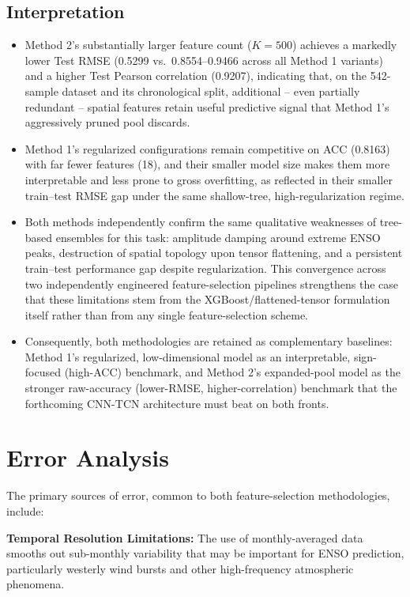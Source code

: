 \subsection{Interpretation}
\begin{itemize}
\item Method 2's substantially larger feature count ($K=500$) achieves a markedly lower Test RMSE (0.5299 vs.\ 0.8554--0.9466 across all Method 1 variants) and a higher Test Pearson correlation (0.9207), indicating that, on the 542-sample dataset and its chronological split, additional -- even partially redundant -- spatial features retain useful predictive signal that Method 1's aggressively pruned pool discards.
\item Method 1's regularized configurations remain competitive on ACC (0.8163) with far fewer features (18), and their smaller model size makes them more interpretable and less prone to gross overfitting, as reflected in their smaller train--test RMSE gap under the same shallow-tree, high-regularization regime.
\item Both methods independently confirm the same qualitative weaknesses of tree-based ensembles for this task: amplitude damping around extreme ENSO peaks, destruction of spatial topology upon tensor flattening, and a persistent train--test performance gap despite regularization. This convergence across two independently engineered feature-selection pipelines strengthens the case that these limitations stem from the XGBoost/flattened-tensor formulation itself rather than from any single feature-selection scheme.
\item Consequently, both methodologies are retained as complementary baselines: Method 1's regularized, low-dimensional model as an interpretable, sign-focused (high-ACC) benchmark, and Method 2's expanded-pool model as the stronger raw-accuracy (lower-RMSE, higher-correlation) benchmark that the forthcoming CNN-TCN architecture must beat on both fronts.
\end{itemize}

\section{Error Analysis}

The primary sources of error, common to both feature-selection methodologies, include:

\textbf{Temporal Resolution Limitations:} The use of monthly-averaged data smooths out sub-monthly variability that may be important for ENSO prediction, particularly westerly wind bursts and other high-frequency atmospheric phenomena.

